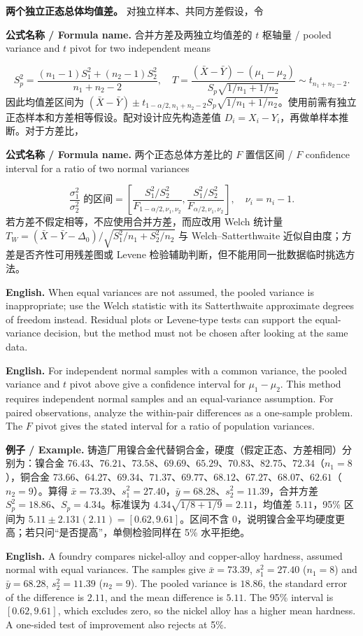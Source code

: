 \documentclass[UTF8,11pt,a4paper]{ctexart}
\newcommand{\EN}[1]{\par\noindent\textbf{English.} #1\par}
\newcommand{\FORMULA}[2]{\par\noindent\textbf{公式名称 / Formula name.} #1 / #2\par}
\newcommand{\EX}[2]{\par\noindent\textbf{例子 / Example.} #1\par\EN{#2}}
\begin{document}
\noindent\textbf{两个独立正态总体均值差。} 对独立样本、共同方差假设，令
\FORMULA{合并方差及两独立均值差的 $t$ 枢轴量}{pooled variance and $t$ pivot for two independent means}
\[
S_p^2=\frac{(n_1-1)S_1^2+(n_2-1)S_2^2}{n_1+n_2-2},
\quad
T=\frac{(\bar X-\bar Y)-(\mu_1-\mu_2)}
{S_p\sqrt{1/n_1+1/n_2}}\sim t_{n_1+n_2-2}.
\]
因此均值差区间为 $(\bar X-\bar Y)\pm t_{1-\alpha/2,n_1+n_2-2}S_p\sqrt{1/n_1+1/n_2}$。使用前需有独立正态样本和方差相等假设。配对设计应先构造差值 $D_i=X_i-Y_i$，再做单样本推断。对于方差比，
\FORMULA{两个正态总体方差比的 $F$ 置信区间}{$F$ confidence interval for a ratio of two normal variances}
\[
\frac{\sigma_1^2}{\sigma_2^2}\text{ 的区间}=
\left[\frac{S_1^2/S_2^2}{F_{1-\alpha/2,\nu_1,\nu_2}},
\frac{S_1^2/S_2^2}{F_{\alpha/2,\nu_1,\nu_2}}\right],
\quad \nu_i=n_i-1.
\]
\noindent 若方差不假定相等，不应使用合并方差，而应改用 Welch 统计量 $T_W=(\bar X-\bar Y-\Delta_0)/\sqrt{S_1^2/n_1+S_2^2/n_2}$ 与 Welch--Satterthwaite 近似自由度；方差是否齐性可用残差图或 Levene 检验辅助判断，但不能用同一批数据临时挑选方法。
\EN{When equal variances are not assumed, the pooled variance is inappropriate; use the Welch statistic with its Satterthwaite approximate degrees of freedom instead. Residual plots or Levene-type tests can support the equal-variance decision, but the method must not be chosen after looking at the same data.}

\EN{For independent normal samples with a common variance, the pooled variance and $t$ pivot above give a confidence interval for $\mu_1-\mu_2$. This method requires independent normal samples and an equal-variance assumption. For paired observations, analyze the within-pair differences as a one-sample problem. The $F$ pivot gives the stated interval for a ratio of population variances.}

\EX{铸造厂用镍合金代替铜合金，硬度（假定正态、方差相同）分别为：镍合金 $76.43$、$76.21$、$73.58$、$69.69$、$65.29$、$70.83$、$82.75$、$72.34$（$n_1=8$），铜合金 $73.66$、$64.27$、$69.34$、$71.37$、$69.77$、$68.12$、$67.27$、$68.07$、$62.61$（$n_2=9$）。算得 $\bar x=73.39$、$s_1^2=27.40$，$\bar y=68.28$、$s_2^2=11.39$，合并方差 $S_p^2=18.86$、$S_p=4.34$。标准误为 $4.34\sqrt{1/8+1/9}=2.11$，均值差 $5.11$，95\% 区间为 $5.11\pm2.131(2.11)=[0.62,9.61]$。区间不含 $0$，说明镍合金平均硬度更高；若只问“是否提高”，单侧检验同样在 5\% 水平拒绝。}{A foundry compares nickel-alloy and copper-alloy hardness, assumed normal with equal variances. The samples give $\bar x=73.39$, $s_1^2=27.40$ ($n_1=8$) and $\bar y=68.28$, $s_2^2=11.39$ ($n_2=9$). The pooled variance is $18.86$, the standard error of the difference is $2.11$, and the mean difference is $5.11$. The 95\% interval is $[0.62,9.61]$, which excludes zero, so the nickel alloy has a higher mean hardness. A one-sided test of improvement also rejects at 5\%.}
\end{document}
